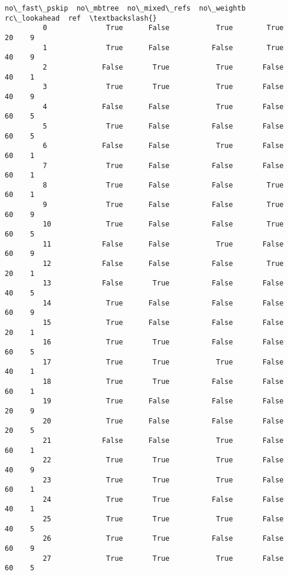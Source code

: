 \documentclass[11pt]{article}
\begin{document}
\begin{Verbatim}[commandchars=\\\{\}]
               no\_fast\_pskip  no\_mbtree  no\_mixed\_refs  no\_weightb  rc\_lookahead  ref  \textbackslash{}
         0              True      False           True        True            20    9   
         1              True      False          False        True            40    9   
         2             False       True           True       False            40    1   
         3              True       True           True       False            40    9   
         4             False      False           True       False            60    5   
         5              True      False          False       False            60    5   
         6             False      False           True       False            60    1   
         7              True      False          False       False            60    1   
         8              True      False          False        True            60    1   
         9              True      False          False        True            60    9   
         10             True      False          False        True            60    5   
         11            False      False           True       False            60    9   
         12            False      False          False        True            20    1   
         13            False       True          False       False            40    5   
         14             True      False          False       False            60    9   
         15             True      False          False       False            20    1   
         16             True       True          False       False            60    5   
         17             True       True           True       False            40    1   
         18             True       True          False       False            60    1   
         19             True      False          False       False            20    9   
         20             True      False          False       False            20    5   
         21            False      False           True       False            60    1   
         22             True       True           True       False            40    9   
         23             True       True           True       False            60    1   
         24             True       True          False       False            40    1   
         25             True       True           True       False            40    5   
         26             True       True          False       False            60    9   
         27             True       True           True       False            60    5   

\end{Verbatim}
\end{document}
